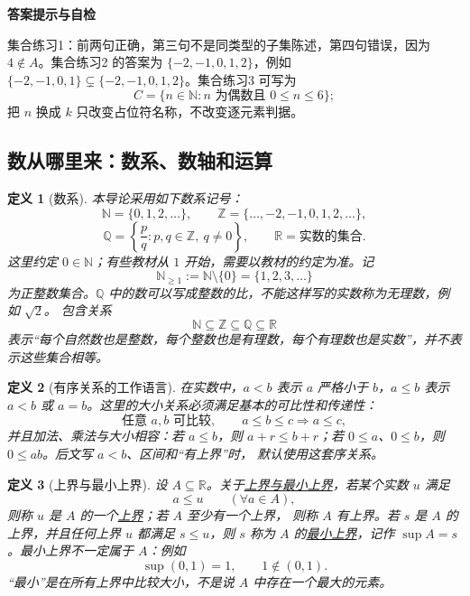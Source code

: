 \documentclass[UTF8,fontset=none,a4paper,11pt]{ctexart}
\theoremstyle{foundation-definition}
\newtheorem{definition}{定义}[section]
\theoremstyle{foundation-theorem}
\theoremstyle{foundation-proposition}
\theoremstyle{foundation-example}
\theoremstyle{foundation-remark}
\theoremstyle{foundation-theorem}
\newcommand{\term}[2]{\hyperref[#1]{#2}}
\newenvironment{answerkey}{%
\begin{mdframed}[backgroundcolor=examplebg,linecolor=examplepurple,linewidth=1.0pt,
  leftline=true,rightline=false,topline=false,bottomline=false,
  skipabove=7pt,skipbelow=8pt,innerleftmargin=10pt,innerrightmargin=8pt,
  innertopmargin=6pt,innerbottommargin=6pt]
{\sffamily\bfseries\color{examplepurple}答案提示与自检}\par\smallskip\small
}{\end{mdframed}}
\begin{document}
\begin{answerkey}
集合练习1：前两句正确，第三句不是同类型的子集陈述，第四句错误，因为 \(4\notin A\)。集合练习2 的答案为 \(\{-2,-1,0,1,2\}\)，例如 \(\{-2,-1,0,1\}\subsetneq\{-2,-1,0,1,2\}\)。集合练习3 可写为
\[
C=\{n\in\mathbb N:n\text{ 为偶数且 }0\le n\le6\};
\]
把 \(n\) 换成 \(k\) 只改变占位符名称，不改变逐元素判据。
\end{answerkey}

\subsection{数从哪里来：数系、数轴和运算}

\begin{definition}[数系]\label{def:number-systems}
本导论采用如下数系记号：
\[
\mathbb N=\{0,1,2,\ldots\},\qquad
\mathbb Z=\{\ldots,-2,-1,0,1,2,\ldots\},
\]
\[
\mathbb Q=\left\{\frac pq:p,q\in\mathbb Z,\ q\ne0\right\},
\qquad
\mathbb R=\text{实数的集合}.
\]
这里约定 \(0\in\mathbb N\)；有些教材从 \(1\) 开始，需要以教材的约定为准。记
\[
\mathbb N_{\ge1}:=\mathbb N\setminus\{0\}=\{1,2,3,\ldots\}
\]
为正整数集合。\(\mathbb Q\) 中的数可以写成整数的比，不能这样写的实数称为无理数，例如 \(\sqrt2\)。
包含关系
\[
\mathbb N\subseteq\mathbb Z\subseteq\mathbb Q\subseteq\mathbb R
\]
表示“每个自然数也是整数，每个整数也是有理数，每个有理数也是实数”，并不表示这些集合相等。
\end{definition}

\begin{definition}[有序关系的工作语言]\label{def:ordered-relation}
在实数中，\(a<b\) 表示 \(a\) 严格小于 \(b\)，\(a\le b\) 表示
\(a<b\) 或 \(a=b\)。这里的大小关系必须满足基本的可比性和传递性：
\[
\text{任意 }a,b\text{ 可比较},\qquad
a\le b\le c\Longrightarrow a\le c,
\]
并且加法、乘法与大小相容：若 \(a\le b\)，则 \(a+r\le b+r\)；若
\(0\le a\)、\(0\le b\)，则 \(0\le ab\)。后文写 \(a<b\)、区间和“有上界”时，
默认使用这套序关系。
\end{definition}

\begin{definition}[上界与最小上界]\label{def:upper-bound-supremum}\label{def:upper-bound}\label{def:supremum}
设 \(A\subseteq\mathbb R\)。关于\term{def:upper-bound-supremum}{上界与最小上界}，若某个实数 \(u\) 满足
\[
a\le u\qquad(\forall a\in A),
\]
则称 \(u\) 是 \(A\) 的一个\term{def:upper-bound}{上界}；若 \(A\) 至少有一个上界，
则称 \(A\) 有上界。若 \(s\) 是 \(A\) 的上界，并且任何上界 \(u\) 都满足
\(s\le u\)，则 \(s\) 称为 \(A\) 的\term{def:supremum}{最小上界}，记作
\(\sup A=s\)。最小上界不一定属于 \(A\)：例如
\[
\sup(0,1)=1,\qquad 1\notin(0,1).
\]
“最小”是在所有上界中比较大小，不是说 \(A\) 中存在一个最大的元素。
\end{definition}
\end{document}
